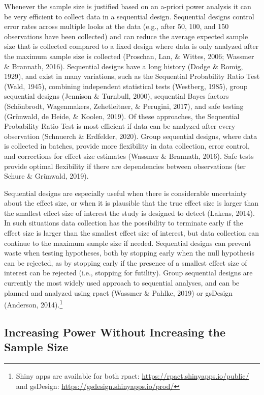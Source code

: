 \documentclass[
  english,
  ,jou, a4paper,floatsintext]{apa6}
\begin{document}
Whenever the sample size is justified based on an a-priori power analysis it can be very efficient to collect data in a sequential design. Sequential designs control error rates across multiple looks at the data (e.g., after 50, 100, and 150 observations have been collected) and can reduce the average expected sample size that is collected compared to a fixed design where data is only analyzed after the maximum sample size is collected (Proschan, Lan, \& Wittes, 2006; Wassmer \& Brannath, 2016). Sequential designs have a long history (Dodge \& Romig, 1929), and exist in many variations, such as the Sequential Probability Ratio Test (Wald, 1945), combining independent statistical tests (Westberg, 1985), group sequential designs (Jennison \& Turnbull, 2000), sequential Bayes factors (Schönbrodt, Wagenmakers, Zehetleitner, \& Perugini, 2017), and safe testing (Grünwald, de Heide, \& Koolen, 2019). Of these approaches, the Sequential Probability Ratio Test is most efficient if data can be analyzed after every observation (Schnuerch \& Erdfelder, 2020). Group sequential designs, where data is collected in batches, provide more flexibility in data collection, error control, and corrections for effect size estimates (Wassmer \& Brannath, 2016). Safe tests provide optimal flexibility if there are dependencies between observations (ter Schure \& Grünwald, 2019).

Sequential designs are especially useful when there is considerable uncertainty about the effect size, or when it is plausible that the true effect size is larger than the smallest effect size of interest the study is designed to detect (Lakens, 2014). In such situations data collection has the possibility to terminate early if the effect size is larger than the smallest effect size of interest, but data collection can continue to the maximum sample size if needed. Sequential designs can prevent waste when testing hypotheses, both by stopping early when the null hypothesis can be rejected, as by stopping early if the presence of a smallest effect size of interest can be rejected (i.e., stopping for futility). Group sequential designs are currently the most widely used approach to sequential analyses, and can be planned and analyzed using rpact (Wassmer \& Pahlke, 2019) or gsDesign (Anderson, 2014).\footnote{Shiny apps are available for both rpact: \url{https://rpact.shinyapps.io/public/} and gsDesign: \url{https://gsdesign.shinyapps.io/prod/}}

\hypertarget{increasing-power-without-increasing-the-sample-size}{%
\subsection{Increasing Power Without Increasing the Sample Size}\label{increasing-power-without-increasing-the-sample-size}}
\end{document}
